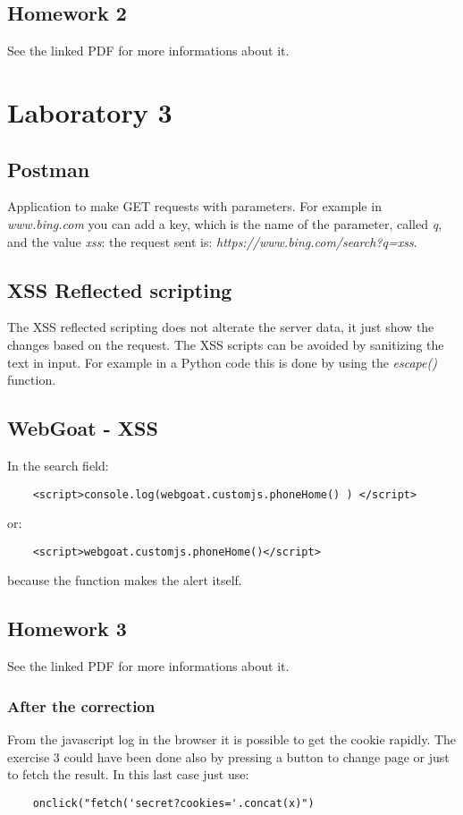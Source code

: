 \documentclass[a4paper, 10pt, titlepage]{article}
\begin{document}
\subsection{Homework 2}
See the linked PDF for more informations about it. 
	
\section{Laboratory 3}
\subsection{Postman}
Application to make GET requests with parameters. For example in \textit{www.bing.com} you can add a key, which is the name of the parameter, called \textit{q}, and the value \textit{xss}: the request sent is: \textit{https://www.bing.com/search?q=xss}.
\subsection{XSS Reflected scripting}
The XSS reflected scripting does not alterate the server data, it just show the changes based on the request.
The XSS scripts can be avoided by sanitizing the text in input. For example in a Python code this is done by using the \textit{escape()} function.
\subsection{WebGoat - XSS}
In the search field:
\begin{lstlisting}
	<script>console.log(webgoat.customjs.phoneHome() ) </script>
\end{lstlisting}
or:
\begin{lstlisting}
	<script>webgoat.customjs.phoneHome()</script>
\end{lstlisting}
because the function makes the alert itself.
\subsection{Homework 3}
	See the linked PDF for more informations about it. 
\subsubsection{After the correction}
From the javascript log in the browser it is possible to get the cookie rapidly. The exercise 3 could have been done also by pressing a button to change page or just to fetch the result. In this last case just use:
\begin{lstlisting}
	onclick("fetch('secret?cookies='.concat(x)")
\end{lstlisting}
\end{document}
